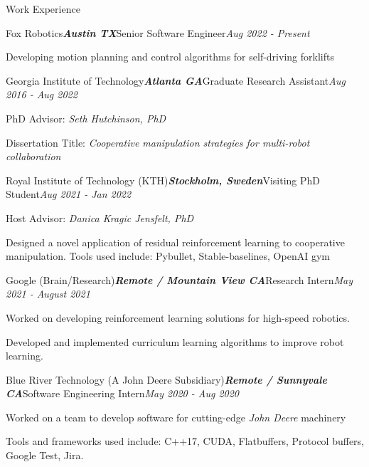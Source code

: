 \documentclass{resume} %
\begin{document}
\begin{rSection}{Work Experience}
\begin{rSubsection}{Fox Robotics}{\bf \em Austin TX}{Senior Software Engineer}{\em Aug 2022 - Present}
\item Developing motion planning and control algorithms for self-driving forklifts
\end{rSubsection}

\begin{rSubsection}{Georgia Institute of Technology}{\bf \em Atlanta GA}{Graduate Research Assistant}{\em Aug 2016 - Aug 2022}
\item PhD Advisor: {\em Seth Hutchinson, PhD}
\item Dissertation Title: {\em Cooperative manipulation strategies for multi-robot collaboration}
\end{rSubsection}

\begin{rSubsection}{Royal Institute of Technology (KTH)}{\bf \em Stockholm, Sweden}{Visiting PhD Student}{\em Aug 2021 - Jan 2022}
\item Host Advisor: {\em Danica Kragic Jensfelt, PhD}
\item Designed a novel application of residual reinforcement learning to cooperative manipulation. Tools used include: Pybullet, Stable-baselines, OpenAI gym
\end{rSubsection}

\begin{rSubsection}{Google (Brain/Research)}{\bf \em Remote / Mountain View CA}{Research Intern}{\em May 2021 - August 2021}
\item Worked on developing reinforcement learning solutions for high-speed robotics.
\item Developed and implemented curriculum learning algorithms to improve robot learning.
\end{rSubsection}

\begin{rSubsection}{Blue River Technology (A John Deere Subsidiary)}{\bf \em Remote / Sunnyvale CA}{Software Engineering Intern}{\em May 2020 - Aug 2020}
\item Worked on a team to develop software for cutting-edge {\em John Deere} machinery
\item Tools and frameworks used include: C++17, CUDA, Flatbuffers, Protocol buffers, Google Test, Jira.
\end{rSubsection}


\end{rSection}
\end{document}
